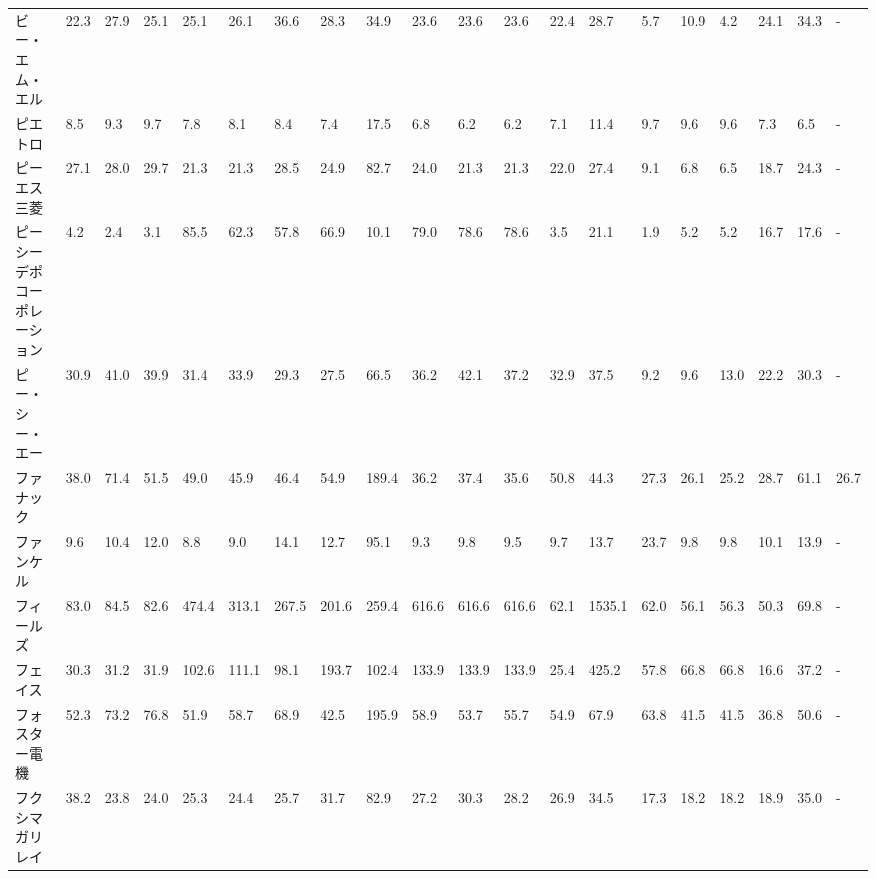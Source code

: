 \begin{longtable}[c]{lp{3mm}p{3mm}p{3mm}p{3mm}p{3mm}p{3mm}p{3mm}p{3mm}p{3mm}p{3mm}p{3mm}p{3mm}p{3mm}p{3mm}p{3mm}p{3mm}p{3mm}p{3mm}p{3mm}}
ビー・エム・エル        &   22.3 &   27.9 &      25.1 &      25.1 &       26.1 &    36.6 &    28.3 &     34.9 &    23.6 &    23.6 &   23.6 &   22.4 &    28.7 &     5.7 &    10.9 &    4.2 &   24.1 &    34.3 &      - \\
ピエトロ            &    8.5 &    9.3 &       9.7 &       7.8 &        8.1 &     8.4 &     7.4 &     17.5 &     6.8 &     6.2 &    6.2 &    7.1 &    11.4 &     9.7 &     9.6 &    9.6 &    7.3 &     6.5 &      - \\
ピーエス三菱          &   27.1 &   28.0 &      29.7 &      21.3 &       21.3 &    28.5 &    24.9 &     82.7 &    24.0 &    21.3 &   21.3 &   22.0 &    27.4 &     9.1 &     6.8 &    6.5 &   18.7 &    24.3 &      - \\
ピーシーデポコーポレーション  &    4.2 &    2.4 &       3.1 &      85.5 &       62.3 &    57.8 &    66.9 &     10.1 &    79.0 &    78.6 &   78.6 &    3.5 &    21.1 &     1.9 &     5.2 &    5.2 &   16.7 &    17.6 &      - \\
ピー・シー・エー        &   30.9 &   41.0 &      39.9 &      31.4 &       33.9 &    29.3 &    27.5 &     66.5 &    36.2 &    42.1 &   37.2 &   32.9 &    37.5 &     9.2 &     9.6 &   13.0 &   22.2 &    30.3 &      - \\
ファナック           &   38.0 &   71.4 &      51.5 &      49.0 &       45.9 &    46.4 &    54.9 &    189.4 &    36.2 &    37.4 &   35.6 &   50.8 &    44.3 &    27.3 &    26.1 &   25.2 &   28.7 &    61.1 &   26.7 \\
ファンケル           &    9.6 &   10.4 &      12.0 &       8.8 &        9.0 &    14.1 &    12.7 &     95.1 &     9.3 &     9.8 &    9.5 &    9.7 &    13.7 &    23.7 &     9.8 &    9.8 &   10.1 &    13.9 &      - \\
フィールズ           &   83.0 &   84.5 &      82.6 &     474.4 &      313.1 &   267.5 &   201.6 &    259.4 &   616.6 &   616.6 &  616.6 &   62.1 &  1535.1 &    62.0 &    56.1 &   56.3 &   50.3 &    69.8 &      - \\
フェイス            &   30.3 &   31.2 &      31.9 &     102.6 &      111.1 &    98.1 &   193.7 &    102.4 &   133.9 &   133.9 &  133.9 &   25.4 &   425.2 &    57.8 &    66.8 &   66.8 &   16.6 &    37.2 &      - \\
フォスター電機         &   52.3 &   73.2 &      76.8 &      51.9 &       58.7 &    68.9 &    42.5 &    195.9 &    58.9 &    53.7 &   55.7 &   54.9 &    67.9 &    63.8 &    41.5 &   41.5 &   36.8 &    50.6 &      - \\
フクシマガリレイ        &   38.2 &   23.8 &      24.0 &      25.3 &       24.4 &    25.7 &    31.7 &     82.9 &    27.2 &    30.3 &   28.2 &   26.9 &    34.5 &    17.3 &    18.2 &   18.2 &   18.9 &    35.0 &      - \\

\end{longtable}
